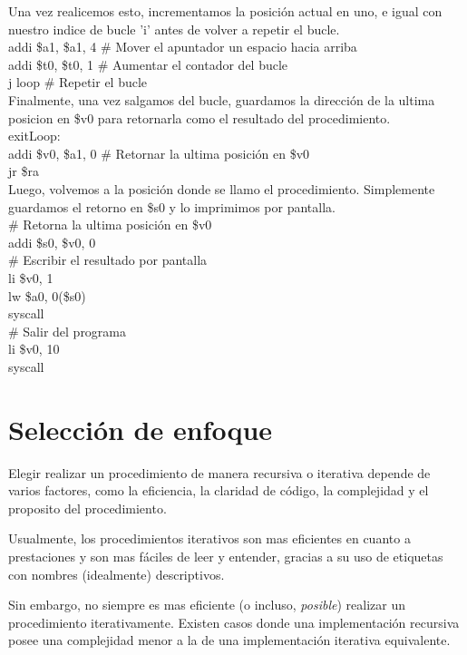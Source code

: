 \documentclass[titlepage]{article}
\begin{document}
Una vez realicemos esto, incrementamos la posición actual en uno, e igual con nuestro indice de bucle 'i' antes de volver a repetir el bucle.\\
		
\noindent addi \$a1, \$a1, 4 \# Mover el apuntador un espacio hacia arriba\\
		addi \$t0, \$t0, 1 \# Aumentar el contador del bucle\\
		j loop \# Repetir el bucle\\

Finalmente, una vez salgamos del bucle, guardamos la dirección de la ultima posicion en \$v0 para retornarla como el resultado del procedimiento.\\

\noindent exitLoop:\\
		addi \$v0, \$a1, 0 \# Retornar la ultima posición en \$v0\\
		jr \$ra\\

Luego, volvemos a la posición donde se llamo el procedimiento. Simplemente guardamos el retorno en \$s0 y lo imprimimos por pantalla.\\

\noindent \# Retorna la ultima posición en \$v0\\
	addi \$s0, \$v0, 0\\
    \# Escribir el resultado por pantalla\\
	li \$v0, 1\\
	lw \$a0, 0(\$s0)\\
	syscall\\
	\# Salir del programa\\
	li \$v0, 10\\
	syscall\\

\section*{Selección de enfoque}

Elegir realizar un procedimiento de manera recursiva o iterativa depende de varios factores, como la eficiencia, la claridad de código, la complejidad y el proposito del procedimiento.

Usualmente, los procedimientos iterativos son mas eficientes en cuanto a prestaciones y son mas fáciles de leer y entender, gracias a su uso de etiquetas con nombres (idealmente) descriptivos.

Sin embargo, no siempre es mas eficiente (o incluso, \emph{posible}) realizar un procedimiento iterativamente. Existen casos donde una implementación recursiva posee una complejidad menor a la de una implementación iterativa equivalente.
\end{document}
